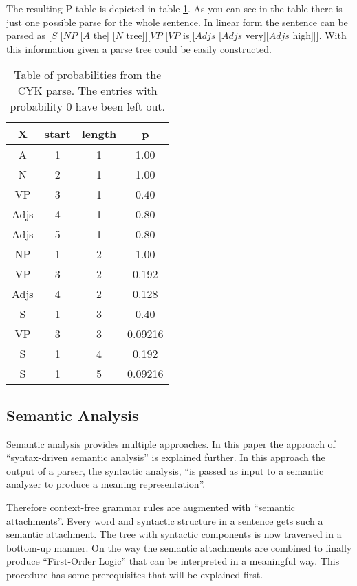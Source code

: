 \documentclass[12pt,twoside]{scrartcl}
\theoremstyle{plain}
\theoremstyle{definition}
\theoremstyle{remark}
\begin{document}
		The resulting P table is depicted in table \ref{tab:p}. As you can see in the table there is just one possible parse for the whole sentence. In linear form the sentence can be parsed as [$S$ [$NP$ [$A$ the] [$N$ tree]][$VP$ [$VP$ is][$Adjs$ [$Adjs$ very][$Adjs$ high]]]. With this information given a parse tree could be easily constructed.
		
		\begin{table}
			\caption{Table of probabilities from the CYK parse. The entries with probability 0 have been left out.}
			\label{tab:p}
			\centering
			\begin{tabular}{|c|c|c|c|}
				\hline
				X & start & length & p \\
				\hline
				\hline
				A & 1 & 1 & 1.00 \\
				\hline
				N & 2 & 1 & 1.00 \\
				\hline				
				VP & 3 & 1 & 0.40 \\
				\hline
				Adjs & 4 & 1 & 0.80 \\
				\hline
				Adjs & 5 & 1 & 0.80 \\
				\hline
				NP & 1 & 2 & 1.00 \\
				\hline
				VP & 3 & 2 & 0.192 \\
				\hline
				Adjs & 4 & 2 & 0.128 \\
				\hline
				S & 1 & 3 & 0.40 \\
				\hline
				VP & 3 & 3 & 0.09216 \\
				\hline
				S & 1 & 4 & 0.192 \\
				\hline
				S & 1 & 5 & 0.09216 \\
				\hline
			\end{tabular}
		\end{table}
	\subsection{Semantic Analysis}
	\label{subSec:semanticAnalysis}
	
		Semantic analysis provides multiple approaches. In this paper the approach of ``syntax-driven semantic analysis''\cite[p.~617]{Jurafsky2009} is explained further. In this approach the output of a parser, the syntactic analysis, ``is passed as input to a semantic analyzer to produce a meaning representation''\cite[p.~618]{Jurafsky2009}.

		Therefore context-free grammar rules are augmented with ``semantic attachments''\cite[p.~618]{Jurafsky2009}. Every word and syntactic structure in a sentence gets such a semantic attachment. The tree with syntactic components is now traversed in a bottom-up manner. On the way the semantic attachments are combined to finally produce ``First-Order Logic''\cite[p.~589]{Jurafsky2009a} that can be interpreted in a meaningful way. This procedure has some prerequisites that will be explained first.
		
\end{document}
